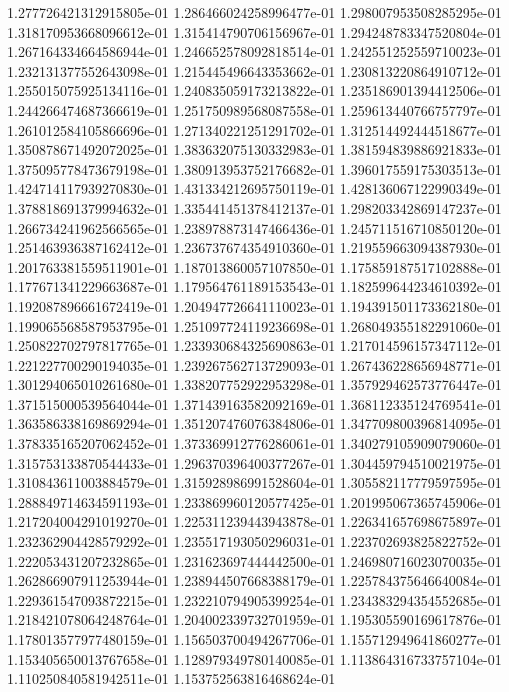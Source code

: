 1.277726421312915805e-01
1.286466024258996477e-01
1.298007953508285295e-01
1.318170953668096612e-01
1.315414790706156967e-01
1.294248783347520804e-01
1.267164334664586944e-01
1.246652578092818514e-01
1.242551252559710023e-01
1.232131377552643098e-01
1.215445496643353662e-01
1.230813220864910712e-01
1.255015075925134116e-01
1.240835059173213822e-01
1.235186901394412506e-01
1.244266474687366619e-01
1.251750989568087558e-01
1.259613440766757797e-01
1.261012584105866696e-01
1.271340221251291702e-01
1.312514492444518677e-01
1.350878671492072025e-01
1.383632075130332983e-01
1.381594839886921833e-01
1.375095778473679198e-01
1.380913953752176682e-01
1.396017559175303513e-01
1.424714117939270830e-01
1.431334212695750119e-01
1.428136067122990349e-01
1.378818691379994632e-01
1.335441451378412137e-01
1.298203342869147237e-01
1.266734241962566565e-01
1.238978873147466436e-01
1.245711516710850120e-01
1.251463936387162412e-01
1.236737674354910360e-01
1.219559663094387930e-01
1.201763381559511901e-01
1.187013860057107850e-01
1.175859187517102888e-01
1.177671341229663687e-01
1.179564761189153543e-01
1.182599644234610392e-01
1.192087896661672419e-01
1.204947726641110023e-01
1.194391501173362180e-01
1.199065568587953795e-01
1.251097724119236698e-01
1.268049355182291060e-01
1.250822702797817765e-01
1.233930684325690863e-01
1.217014596157347112e-01
1.221227700290194035e-01
1.239267562713729093e-01
1.267436228656948771e-01
1.301294065010261680e-01
1.338207752922953298e-01
1.357929462573776447e-01
1.371515000539564044e-01
1.371439163582092169e-01
1.368112335124769541e-01
1.363586338169869294e-01
1.351207476076384806e-01
1.347709800396814095e-01
1.378335165207062452e-01
1.373369912776286061e-01
1.340279105909079060e-01
1.315753133870544433e-01
1.296370396400377267e-01
1.304459794510021975e-01
1.310843611003884579e-01
1.315928986991528604e-01
1.305582117779597595e-01
1.288849714634591193e-01
1.233869960120577425e-01
1.201995067365745906e-01
1.217204004291019270e-01
1.225311239443943878e-01
1.226341657698675897e-01
1.232362904428579292e-01
1.235517193050296031e-01
1.223702693825822752e-01
1.222053431207232865e-01
1.231623697444442500e-01
1.246980716023070035e-01
1.262866907911253944e-01
1.238944507668388179e-01
1.225784375646640084e-01
1.229361547093872215e-01
1.232210794905399254e-01
1.234383294354552685e-01
1.218421078064248764e-01
1.204002339732701959e-01
1.195305590169617876e-01
1.178013577977480159e-01
1.156503700494267706e-01
1.155712949641860277e-01
1.153405650013767658e-01
1.128979349780140085e-01
1.113864316733757104e-01
1.110250840581942511e-01
1.153752563816468624e-01
